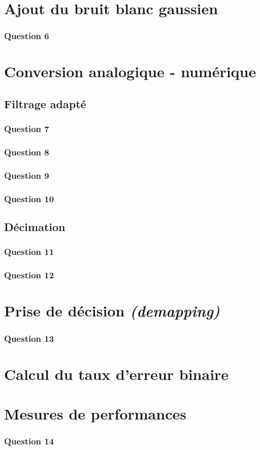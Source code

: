 \documentclass[a4paper,11pt]{article}
\begin{document}
\section{Ajout du bruit blanc gaussien}
\subsubsection*{Question 6}

\section{Conversion analogique - numérique}
\subsection{Filtrage adapté}
\subsubsection*{Question 7}
\subsubsection*{Question 8}
\subsubsection*{Question 9}
\subsubsection*{Question 10}

\subsection{Décimation}
\subsubsection*{Question 11}
\subsubsection*{Question 12}

\section{Prise de décision \emph{(demapping)}}
\subsubsection*{Question 13}

\section{Calcul du taux d'erreur binaire}

\section{Mesures de performances}
\subsubsection*{Question 14}

\end{document}
